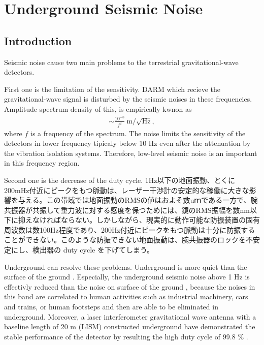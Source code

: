 \chapter{Underground Seismic Noise}

\section{Introduction}
Seismic noise cause two main problems to the terrestrial gravitational-wave detectors.

First one is the limitation of the sensitivity. DARM which recieve the gravitational-wave signal is disturbed by the seismic noises in these frequencies. Amplitude spectrum density of this, is empirically kwnon as 
\begin{eqnarray}
  \sim \frac{10^{-8}}{f^2}\ \mathrm{m}/\sqrt{\mathrm{Hz}},
\end{eqnarray}
where $f$ is a frequency of the spectrum. The noise limits the sensitivity of the detectors in lower frequency tipicaly below 10 $\mathrm{Hz}$ even after the attenuation by the vibration isolation systems. Therefore, low-level seismic noise is an important in this frequency region.

Second one is the decrease of the duty cycle. 1Hz以下の地面振動、とくに200mHz付近にピークをもつ脈動は、レーザー干渉計の安定的な稼働に大きな影響を与える。この帯域では地面振動のRMSの値はおよそ数uｍである一方で、腕共振器が共振して重力波に対する感度を保つためには、鏡のRMS振幅を数nm以下に抑えなければならない。しかしながら、現実的に動作可能な防振装置の固有周波数は数100Hz程度であり、200Hz付近にピークをもつ脈動は十分に防振することができない。このような防振できない地面振動は、腕共振器のロックを不安定にし、検出器の duty cycle を下げてしまう。

Underground can resolve these problems. Underground is more quiet than the surface of the ground \cite{carter1991high}. Especially, the underground seismic noise above 1 $\mathrm{Hz}$ is effectivly reduced than the noise on surface of the ground \cite{lcgt2009lcgt}, because the noises in this band are correlated to human activities such as industrial machinery, cars and trains, or human footsteps \cite{bonnefoy2006nature} and then are able to be eliminated in underground. Moreover, a laser interferometer gravitational wave antenna with a baseline length of 20 $\mathrm{m}$ (LISM) constructed underground have demonstrated the stable performance of the detector by resulting the high duty cycle of 99.8 $\%$ \cite{sato2004ultrastable}. 

